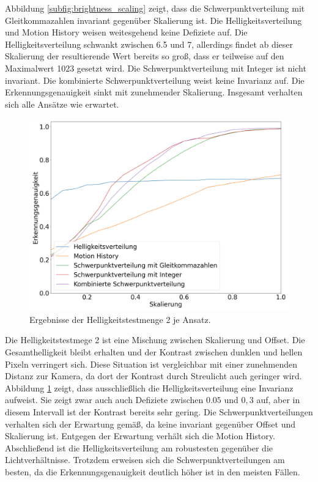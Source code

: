 \newline
\newline
Abbildung \ref{subfig:brightness_scaling} zeigt, dass die Schwerpunktverteilung mit Gleitkommazahlen invariant gegenüber Skalierung ist. Die Helligkeitsverteilung und Motion History weisen weitesgehend
keine Defiziete auf. Die Helligkeitsverteilung schwankt zwischen 6.5 und 7, allerdings findet ab dieser Skalierung der resultierende Wert bereits so groß, dass er teilweise auf den Maximalwert 1023
gesetzt wird. Die Schwerpunktverteilung mit Integer ist nicht invariant. Die kombinierte Schwerpunktverteilung weist keine Invarianz auf. Die Erkennungsgenauigkeit sinkt mit zunehmender Skalierung.
Insgesamt verhalten sich alle Ansätze wie erwartet.
\begin{figure}[h!]
    \centering
    \includegraphics[width=\linewidth]{images/brightness2_scaling.png}
    \caption{Ergebnisse der Helligkeitstestmenge 2 je Ansatz.}
    \label{fig:brightness2_scaling}
\end{figure}
\newline
\newline
Die Helligkeitstestmege 2 ist eine Mischung zwischen Skalierung und Offset. Die Gesamthelligkeit bleibt erhalten und der Kontrast zwischen dunklen
und hellen Pixeln verringert sich. Diese Situation ist vergleichbar mit einer zunehmenden Distanz zur Kamera, da dort der Kontrast durch Streulicht auch geringer wird.
\newline
\newline
Abbildung \ref{fig:brightness2_scaling} zeigt, dass ausschließlich die Helligkeitsverteilung eine Invarianz aufweist. Sie zeigt zwar auch auch Defiziete zwischen $0.05$ und $0,3$ auf, aber in diesem
Intervall ist der Kontrast bereits sehr gering. Die Schwerpunktverteilungen verhalten sich der Erwartung gemäß, da keine invariant gegenüber Offset und Skalierung ist. Entgegen der Erwartung verhält
sich die Motion History.
\newline
\newline
Abschließend ist die Helligkeitsverteilung am robustesten gegenüber die Lichtverhältnisse. Trotzdem erweisen sich die Schwerpunktverteilungen am besten, da die Erkennungsgenauigkeit deutlich höher ist
in den meisten Fällen.